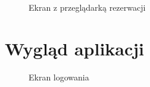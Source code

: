 \documentclass[a4paper,onecolumn,oneside,11pt,wide,floatssmall]{mwrep}
\theoremstyle{definition}
\theoremstyle{plain}%
\theoremstyle{remark}
\begin{document}
\begin{figure}[H]
  \begin{center}
  \end{center}
  \caption{Ekran z przeglądarką rezerwacji}
  \label{fig:mockups-browse-reservations}
\end{figure}



\chapter{Wygląd aplikacji}


\begin{figure}[H]
  \begin{center}
  \end{center}
  \caption{Ekran logowania}
  \label{fig:app-login-form}
\end{figure}
\end{document}
